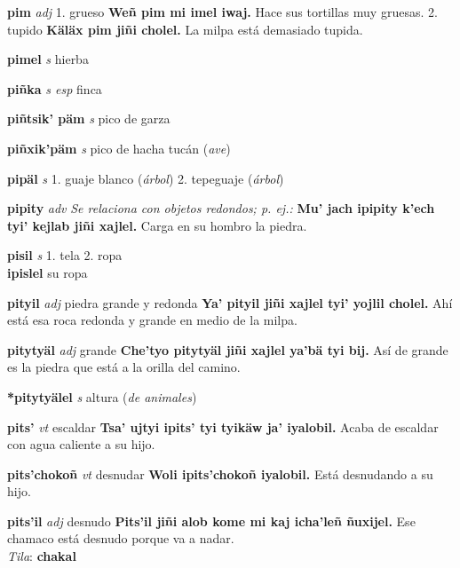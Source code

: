 \documentclass[10pt]{scrbook}
\newcommand{\entry}[1]{\textbf{#1}}
\newcommand{\onedefinition}[1]{#1.}
\newcommand{\nontranslationdef}[1]{\textit{#1}}
\newcommand{\partofspeech}[1]{\textit{#1}}
\newcommand{\spanishtranslation}[1]{#1}
\newcommand{\clarification}[1]{(\textit{#1})}
\newcommand{\cholexample}[1]{\textbf{#1}}
\newcommand{\exampletranslation}[1]{#1}
\newcommand{\dialectvariant}[1]{\\\textit{#1}:}
\newcommand{\dialectword}[1]{\textbf{#1}}
\newcommand{\secondaryentry}[1]{\\\textbf{#1}}
\newcommand{\secondtranslation}[1]{#1}
\begin{document}
\begin{multicols}{2}
\entry{pim}
\partofspeech{adj}
\onedefinition{1}
\spanishtranslation{grueso}
\cholexample{Weñ pim mi imel iwaj.}
\exampletranslation{Hace sus tortillas muy gruesas.}
\onedefinition{2}
\spanishtranslation{tupido}
\cholexample{Käläx pim jiñi cholel.}
\exampletranslation{La milpa está demasiado tupida.}

\entry{pimel}
\partofspeech{s}
\spanishtranslation{hierba}

\entry{piñka}
\partofspeech{s esp}
\spanishtranslation{finca}

\entry{piñtsik' päm}
\partofspeech{s}
\spanishtranslation{pico de garza}

\entry{piñxik'päm}
\partofspeech{s}
\spanishtranslation{pico de hacha}
\spanishtranslation{tucán}
\clarification{ave}

\entry{pipäl}
\partofspeech{s}
\onedefinition{1}
\spanishtranslation{guaje blanco}
\clarification{árbol}
\onedefinition{2}
\spanishtranslation{tepeguaje}
\clarification{árbol}

\entry{pipity}
\partofspeech{adv}
\nontranslationdef{Se relaciona con objetos redondos; p. ej.:}
\cholexample{Mu' jach ipipity k'ech tyi' kejlab jiñi xajlel.}
\exampletranslation{Carga en su hombro la piedra.}

\entry{pisil}
\partofspeech{s}
\onedefinition{1}
\spanishtranslation{tela}
\onedefinition{2}
\spanishtranslation{ropa}
\secondaryentry{ipislel}
\secondtranslation{su ropa}

\entry{pityil}
\partofspeech{adj}
\spanishtranslation{piedra grande y redonda}
\cholexample{Ya' pityil jiñi xajlel tyi' yojlil cholel.}
\exampletranslation{Ahí está esa roca redonda y grande en medio de la milpa.}

\entry{pitytyäl}
\partofspeech{adj}
\spanishtranslation{grande}
\cholexample{Che'tyo pitytyäl jiñi xajlel ya'bä tyi bij.}
\exampletranslation{Así de grande es la piedra que está a la orilla del camino.}

\entry{*pitytyälel}
\partofspeech{s}
\spanishtranslation{altura}
\clarification{de animales}

\entry{pits'}
\partofspeech{vt}
\spanishtranslation{escaldar}
\cholexample{Tsa' ujtyi ipits' tyi tyikäw ja' iyalobil.}
\exampletranslation{Acaba de escaldar con agua caliente a su hijo.}

\entry{pits'chokoñ}
\partofspeech{vt}
\spanishtranslation{desnudar}
\cholexample{Woli ipits'chokoñ iyalobil.}
\exampletranslation{Está desnudando a su hijo.}

\entry{pits'il}
\partofspeech{adj}
\spanishtranslation{desnudo}
\cholexample{Pits'il jiñi alob kome mi kaj icha'leñ ñuxijel.}
\exampletranslation{Ese chamaco está desnudo porque va a nadar.}
\dialectvariant{Tila}
\dialectword{chakal}


\end{multicols}
\end{document}
